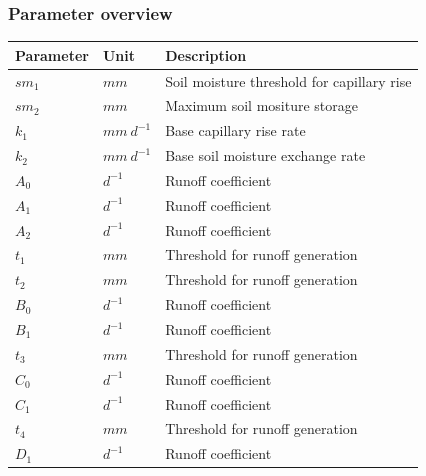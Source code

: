 \newpage
\subsubsection{Parameter overview}
\begin{table}[htbp]
  \centering
    \begin{tabular}{lll}
    \toprule
    Parameter & Unit  & Description \\
    \midrule
    $sm_1$ & $mm$  & Soil moisture threshold for capillary rise \\
    $sm_2$ & $mm$  & Maximum soil mositure storage \\
    $k_1$ & $mm~d^{-1}$ & Base capillary rise rate \\
    $k_2$ & $mm~d^{-1}$ & Base soil moisture exchange rate \\
    $A_0$ & $d^{-1}$ & Runoff coefficient \\
    $A_1$ & $d^{-1}$ & Runoff coefficient \\
    $A_2$ & $d^{-1}$ & Runoff coefficient \\
    $t_1$ & $mm$  & Threshold for runoff generation \\
    $t_2$ & $mm$  & Threshold for runoff generation \\
    $B_0$ & $d^{-1}$ & Runoff coefficient \\
    $B_1$ & $d^{-1}$ & Runoff coefficient \\
    $t_3$ & $mm$  & Threshold for runoff generation \\
    $C_0$ & $d^{-1}$ & Runoff coefficient \\
    $C_1$ & $d^{-1}$ & Runoff coefficient \\
    $t_4$ & $mm$  & Threshold for runoff generation \\
    $D_1$ & $d^{-1}$ & Runoff coefficient \\
    \bottomrule
    \end{tabular}%
  \label{tab:addlabel}%
\end{table}%
